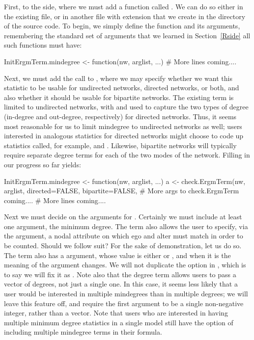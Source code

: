 \documentclass[nojss]{jss}
\begin{document}
First, to the  side, where we must add a function called .  We can do so either in the existing  file, or in another file with extension  that we create in the  directory of the  source code. To begin, we simply define the function and its arguments, remembering the standard set of arguments that we learned in Section~\ref{Rside} all such functions must have:
\begin{CodeChunk}
\begin{CodeInput}
InitErgmTerm.mindegree <- function(nw, arglist, ...) {
  # More lines coming....
}
\end{CodeInput}
\end{CodeChunk}

Next, we must add the call to , where we may specify
whether we want this statistic to be usable for undirected networks,
directed networks, or both, and also whether it should be usable for bipartite networks.
The existing  term  is limited to undirected networks, with  and  used to capture the two types of degree (in-degree and out-degree, respectively) for directed networks. Thus, it seems most reasonable for us to limit mindegree to undirected networks as well; users interested in analogous statistics for directed networks might choose to code up statistics called, for example,  and . Likewise, bipartite networks will typically require separate degree terms for each of the two modes of the network.
Filling in our progress so far yields:
\begin{CodeChunk}
\begin{CodeInput}
InitErgmTerm.mindegree <- function(nw, arglist, ...) {
  a <- check.ErgmTerm(nw, arglist, directed=FALSE, bipartite=FALSE,
    # More args to check.ErgmTerm coming....
  # More lines coming....
}
\end{CodeInput}
\end{CodeChunk}

Next we must decide on the arguments for .  Certainly we must include at least one argument, the minimum degree.  The  term also allows the user to specify, via the  argument, a nodal attribute on which ego and alter must match in order to be counted. Should we follow suit? For the sake of demonstration, let us do so.  The  term also has a 
argument, whose value is either  or , and when it is
 the meaning of the  argument changes.  We will not
duplicate the  option in ,
which is to say we will fix it as .
Note also that the degree term allows users to pass a vector of degrees, not just a single one.  In this case, it seems less likely that a user would be interested in multiple mindegrees than in multiple degrees; we will leave this feature off, and require the first argument to be a single non-negative integer, rather than a vector.  Note that users who are interested in having multiple minimum degree statistics in a single model still have the option of including multiple mindegree terms in their formula.
\end{document}
